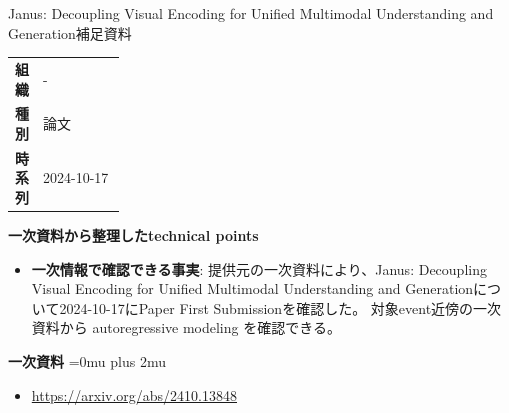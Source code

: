 \begin{technicalnote}{Janus: Decoupling Visual Encoding for Unified Multimodal Understanding and Generation}{補足資料}
\begingroup
\begin{tabularx}{\linewidth}{@{}>{\bfseries}p{0.22\linewidth}X@{}}
組織 & - \\
種別 & 論文 \\
時系列 & 2024-10-17 \\
\end{tabularx}
\smallskip
{\bfseries 一次資料から整理したtechnical points}
\begin{itemize}[leftmargin=1.5em,itemsep=0.35em]
\item \textbf{一次情報で確認できる事実}: 提供元の一次資料により、Janus: Decoupling Visual Encoding for Unified Multimodal Understanding and Generationについて2024-10-17にPaper First Submissionを確認した。 対象event近傍の一次資料から autoregressive modeling を確認できる。
\end{itemize}
\begin{minipage}{\linewidth}
\begin{samepage}
{\bfseries 一次資料}
\begingroup\sloppy
\Urlmuskip=0mu plus 2mu\relax
\begin{itemize}[leftmargin=1.5em,itemsep=0.25em]
\item {\scriptsize\url{https://arxiv.org/abs/2410.13848}}
\end{itemize}
\endgroup
\end{samepage}
\end{minipage}
\endgroup
\end{technicalnote}
\medskip


